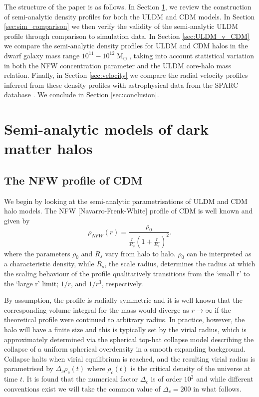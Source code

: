 \documentclass[a4paper,11pt]{article}
\begin{document}
The structure of the paper is as follows. In Section \ref{sec:models}, we review the construction of semi-analytic density profiles for both the ULDM and CDM models. In Section \ref{sec:sim_comparison} we then verify the validity of the semi-analytic ULDM profile  through comparison to simulation data. In Section \ref{sec:ULDM_v_CDM} we compare the semi-analytic density profiles for ULDM and CDM halos in the dwarf galaxy mass range $10^{11} - 10^{12}\operatorname{M}_{\odot}$, taking into account statistical variation in both the NFW concentration parameter and the ULDM core-halo mass relation. Finally, in Section \ref{sec:velocity} we compare the radial velocity profiles inferred from these density profiles with astrophysical data from the SPARC database \cite{Lelli:2016zqa}. We conclude in Section \ref{sec:conclusion}.







\section{Semi-analytic models of dark matter halos}\label{sec:models}

\subsection{The NFW profile of CDM}

We begin by looking at the semi-analytic parametrisations of ULDM and CDM halo models. The  NFW [Navarro-Frenk-White] profile of CDM \cite{Navarro:1995iw, Maccio:2008pcd}  is well known and given by
%
\begin{equation}\label{eq:nfw}
    \rho_{NFW}(r)=\frac{\rho_0}{\frac{r}{R_s}\left(1+\frac{r}{R_s}\right)^2}.
\end{equation}
%
where the parameters $\rho_0$ and $R_s$ vary from halo to halo. $\rho_0$ can be interpreted as a characteristic density, while $R_s$, the scale radius, determines the radius at which the scaling behaviour of the profile qualitatively transitions from the `small r' to the `large r' limit; $1/r$, and $1/r^3$, respectively.

By assumption, the profile is radially symmetric and it is well known that the corresponding volume integral for the mass would diverge as $r\rightarrow \infty$ if the theoretical profile were continued to arbitrary radius. In practice, however, the halo will have a finite size and this is typically set by the virial radius, which is approximately determined via the spherical top-hat collapse model \cite{White:2000jv, Suto:2015jdt, Herrera:2017epn} describing the collapse of a uniform spherical overdensity in a smooth expanding background. Collapse halts when virial equilibrium is reached, and the resulting virial radius is parametrised by $\Delta_c \rho_c(t)$ where $\rho_c(t)$ is the critical density of the universe at time $t$. It is found that the numerical factor $\Delta_c$ is of order $10^2$ and while different conventions exist we will take the common value of $\Delta_c = 200$ \cite{Richings:2018} in what follows. 
\end{document}
